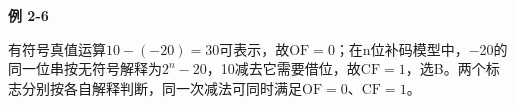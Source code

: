 {\color{ink}\bfseries 例 2-6}\par\vspace{1bp}有符号真值运算\(10-(-20)=\allowbreak{}30\)可表示，故\(\mathrm{OF}=\allowbreak{}0\)；在n位补码模型中，\(-\)20的同一位串按无符号解释为\(2^{n}-20\)，10减去它需要借位，故\(\mathrm{CF}=\allowbreak{}1\)，选B。两个标志分别按各自解释判断，同一次减法可同时满足\(\mathrm{OF}=\allowbreak{}0\)、\(\mathrm{CF}=\allowbreak{}1\)。
